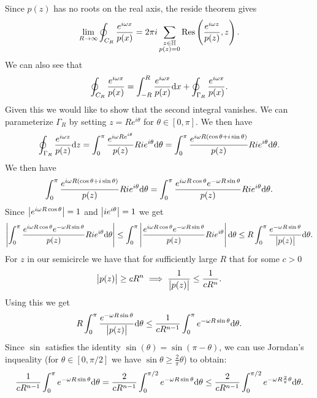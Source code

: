 \documentclass[11pt,a4paper]{article}
\begin{document}
\begin{solution}
\begin{enumerate}
    Since $p(z)$ has no roots on the real axis, the reside theorem gives
    \[
      \lim_{R \to \infty} \oint_{C_R} \frac{e^{i \omega x}}{p(x)} =
      2 \pi i
      \sum_{\substack{z \in \mathbb H \\ p(z) = 0}}
      \Res\del{\frac{e^{i \omega z}}{p(z)},z}.
    \]
    We can also see that
    \[
      \oint_{C_R} \frac{e^{i \omega x}}{p(x)} =
      \int_{-R}^{R} \frac{e^{i \omega x}}{p(x)} \dx +
      \oint_{\Gamma_R} \frac{e^{i \omega x}}{p(x)}.
    \]
    Given this we would like to show that the second integral vanishes.
    We can parameterize $\Gamma_R$ by setting $z = R e^{i \theta}$ for
    $\theta \in [0,\pi]$.
    We then have
    \[
      \oint_{\Gamma_R} \frac{e^{i \omega z}}{p(z)} \dz =
      \int_{0}^{\pi}
      \frac{e^{i \omega R e^{i \theta}}}{p(z)} R i e^{i \theta} \dtheta =
      \int_{0}^{\pi}
      \frac{e^{i \omega R \del{\cos \theta + i \sin\theta}}}{p(z)}
      R i e^{i \theta} \dtheta.
    \]
    We then have
    \[
      \int_{0}^{\pi}
      \frac{e^{i \omega R \del{\cos \theta + i \sin\theta}}}{p(z)}
      R i e^{i \theta} \dtheta =
      \int_{0}^{\pi}
      \frac{e^{i \omega R \cos \theta} e^{- \omega R \sin \theta}}
      {p(z)}R i e^{i \theta} \dtheta.
    \]
    Since $\left\lvert e^{i \omega R \cos \theta}\right\rvert = 1$ and
    $\left\lvert i e^{i \theta}\right\rvert = 1$ we get
    \[
      \left\lvert\int_{0}^{\pi}
      \frac{e^{i \omega R \cos \theta} e^{- \omega R \sin \theta}}
      {p(z)}R i e^{i \theta} \mathrm{d} \theta\right\rvert \le
      \int_{0}^{\pi}
      \left\lvert\frac{e^{i \omega R \cos \theta} e^{- \omega R \sin \theta}}
      {p(z)}R i e^{i \theta}\right\rvert \mathrm{d} \theta \le
      R \int_{0}^{\pi}
      \frac{e^{- \omega R \sin \theta}}
      {\left\lvert p(z)\right\rvert} \mathrm{d} \theta.
    \]
    For $z$ in our semicircle we have that for sufficiently large $R$ that
    for some $c > 0$
    \[
      \left\lvert p(z)\right\rvert \geq c R^n \implies
      \frac{1}{\left\lvert p(z)\right\rvert} \le \frac{1}{c R^n}.
    \]
    Using this we get
    \[
      R \int_{0}^{\pi}
      \frac{e^{- \omega R \sin \theta}}
      {\left\lvert p(z)\right\rvert} \mathrm{d} \theta \le
      \frac{1}{c R^{n-1}}
      \int_{0}^{\pi} e^{- \omega R \sin \theta} \mathrm{d} \theta.
    \]
    Since $\sin$ satisfies the identity $\sin(\theta) = \sin(\pi - \theta)$,
    we can use Jorndan's inqueality (for $\theta \in [0,\pi/2]$ we have
    $\sin \theta \geq \frac{2}{\pi} \theta$) to obtain:
    \[
      \frac{1}{c R^{n-1}}
      \int_{0}^{\pi} e^{- \omega R \sin \theta} \mathrm{d} \theta =
      \frac{2}{c R^{n-1}}
      \int_{0}^{\pi / 2} e^{- \omega R \sin \theta} \mathrm{d} \theta \le
      \frac{2}{c R^{n-1}}
      \int_{0}^{\pi / 2} e^{- \omega R \frac{2}{\pi} \theta} \mathrm{d} \theta.
\]
\end{enumerate}
\end{solution}
\end{document}
